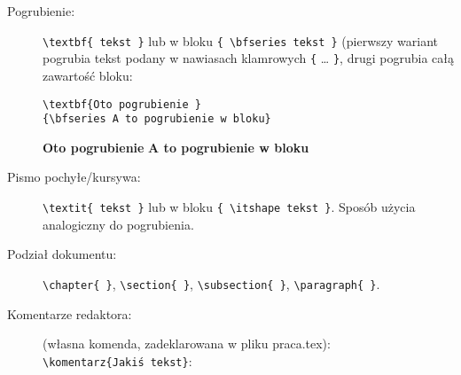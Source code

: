\begin{description}
\item[Pogrubienie:] \verb_\textbf{ tekst }_ lub w bloku \verb_{ \bfseries tekst }_ (pierwszy wariant pogrubia tekst podany w nawiasach klamrowych \verb_{_ \ldots{} \verb_}_, drugi pogrubia całą zawartość bloku:

\begin{verbatim}
\textbf{Oto pogrubienie }
{\bfseries A to pogrubienie w bloku}
\end{verbatim}
\textbf{Oto pogrubienie }
{\bfseries A to pogrubienie w bloku}

\item[Pismo pochyłe/kursywa:] \verb_\textit{ tekst }_ lub w bloku \verb_{ \itshape tekst }_. Sposób użycia analogiczny do pogrubienia.

\item[Podział dokumentu:] \verb_\chapter{ }_, \verb_\section{ }_, \verb_\subsection{ }_, \verb_\paragraph{ }_.

\item[Komentarze redaktora:] (własna komenda, zadeklarowana w pliku praca.tex):\\\verb_\komentarz{Jakiś tekst}_: 

\end{description}
